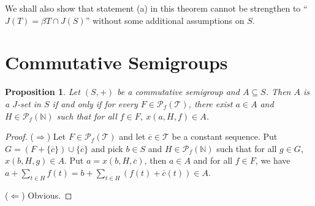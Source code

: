 \documentclass[12pt]{article}
\theoremstyle{plain}
\newtheorem{prop}[thm]{Proposition}
\theoremstyle{definition}
\newcommand{\bbN}{\mathbb{N}}
\newcommand{\calT}{\mathcal{T}}
\newcommand{\Pf}{\mathcal{P}_f}
\begin{document}
We shall also show that statement (a) in this theorem cannot be
strengthen to ``$J(T) = \beta T \cap J(S)$'' without some additional
assumptions on $S$. 

\section{Commutative Semigroups}
\begin{prop}
  Let $(S, +)$ be a commutative semigroup and $A \subseteq S$. 
  Then $A$ is a $J$-set in $S$ if and only if for every $F \in
  \Pf(\calT)$, there exist $a \in A$ and $H \in \Pf(\bbN)$ such that
  for all $f \in F$, $x(a, H, f) \in A$. 
\end{prop}
\begin{proof}
  ($\Rightarrow$)
  Let $F \in \Pf(\calT)$ and let $\overline{c} \in \calT$ be a
  constant sequence.
  Put $G = (F + \{\overline{c}\}) \cup \{\overline{c}\} $ and pick $b
  \in S$ and $H \in \Pf(\bbN)$ such that for all $g \in G$, $x(b,H,g)
  \in A$.
  Put $a = x(b, H, \overline{c})$, then $a \in A$ and for all $f \in
  F$, we have $a + \sum_{t \in H}f(t) = b + \sum_{t \in H} (f(t) +
  \overline{c}(t)) \in A$.

  ($\Leftarrow$) Obvious.
\end{proof}
\end{document}
